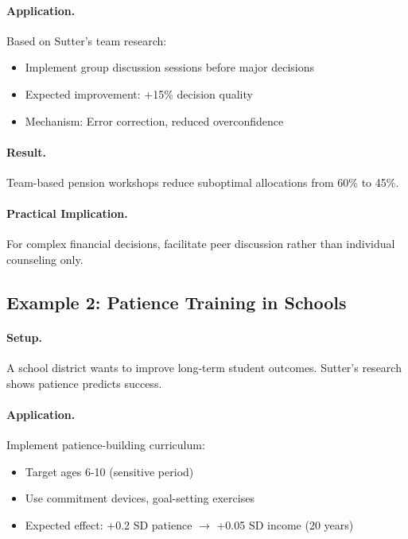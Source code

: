 \paragraph{Application.} Based on Sutter's team research:
\begin{itemize}[nosep]
    \item Implement group discussion sessions before major decisions
    \item Expected improvement: +15\% decision quality
    \item Mechanism: Error correction, reduced overconfidence
\end{itemize}

\paragraph{Result.} Team-based pension workshops reduce suboptimal allocations
from 60\% to 45\%.

\paragraph{Practical Implication.} For complex financial decisions, facilitate
peer discussion rather than individual counseling only.

\subsection{Example 2: Patience Training in Schools}

\paragraph{Setup.} A school district wants to improve long-term student outcomes.
Sutter's research shows patience predicts success.

\paragraph{Application.} Implement patience-building curriculum:
\begin{itemize}[nosep]
    \item Target ages 6-10 (sensitive period)
    \item Use commitment devices, goal-setting exercises
    \item Expected effect: +0.2 SD patience $\rightarrow$ +0.05 SD income (20 years)
\end{itemize}


